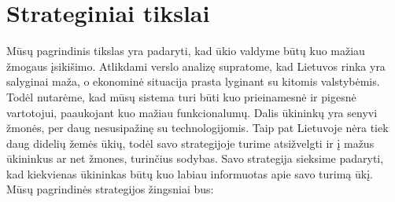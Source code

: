 \documentclass[oneside]{VUMIFPSkursinis}
\begin{document}
\section{Strateginiai tikslai}
	Mūsų pagrindinis tikslas yra padaryti, kad ūkio valdyme būtų kuo mažiau žmogaus įsikišimo. Atlikdami verslo analizę supratome, kad Lietuvos rinka yra salyginai maža, o ekonominė situacija prasta lyginant su kitomis valstybėmis. Todėl nutarėme, kad mūsų sistema turi būti kuo prieinamesnė ir pigesnė vartotojui, paaukojant kuo mažiau funkcionalumų. Dalis ūkininkų yra senyvi žmonės, per daug nesusipažinę su technologijomis. Taip pat Lietuvoje nėra tiek daug didelių žemės ūkių, todėl savo strategijoje turime atsižvelgti ir į mažus ūkininkus ar net žmones, turinčius sodybas. Savo strategija sieksime padaryti, kad kiekvienas ūkininkas būtų kuo labiau informuotas apie savo turimą ūkį. Mūsų pagrindinės strategijos žingsniai bus:
\end{document}
